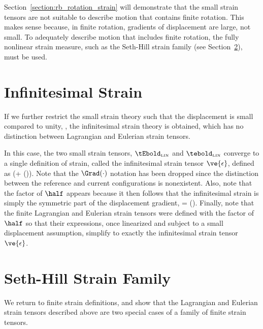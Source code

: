 Section~\ref{section:rb_rotation_strain} will demonstrate that the 
small strain tensors are not suitable to describe motion that
contains finite rotation.  
This makes sense because, in finite rotation, gradients of displacement
are large, not small.  To adequately describe motion that includes 
finite rotation, the fully nonlinear strain measure, 
such as the Seth-Hill strain family 
(see Section~\ref{section:seth_hill}), must be used.

\section{Infinitesimal Strain}
If we further restrict the small strain theory such that the displacement
is small compared to unity, 
\be
\vu {},
\ee
the infinitesimal strain theory
is obtained, which has no distinction between Lagrangian and Eulerian 
strain tensors.  

In this case, the two small strain tensors, 
$\tEbold_{\tiny \mbox{LIN}}$
and 
$\tebold_{\tiny \mbox{LIN}}$
converge to a single definition of strain, called the infinitesimal
strain tensor $\ve{\epsilon}$, defined as
\be
 \ve{\epsilon}  \dst\half(\grad \vu + (\grad \vu)\transpose).
 \label{eq:infinitesimal_strain}
\ee
Note that the $\Grad(\cdot)$ notation has been dropped since the
distinction between the reference and current configurations is 
nonexistent. Also, note that the factor of $\half$ appears because
it then follows that the infinitesimal strain is simply the symmetric
part of the displacement gradient, 
\be
 \ve{\epsilon} = \mbox{\sym}(\grad \vu).
\ee
Finally, note that the finite Lagrangian and Eulerian strain tensors
were defined with the factor of $\half$ so that their expressions, 
once linearized and subject to a small displacement assumption, simplify
to exactly the infinitesimal strain tensor $\ve{\epsilon}$.


\section{Seth-Hill Strain Family}
\label{section:seth_hill}
We return to finite strain definitions, and show that the 
Lagrangian and Eulerian strain tensors described above are two
special cases of a family of finite strain tensors.

